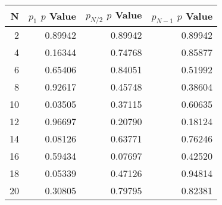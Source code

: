 \begin{tabular}{rrrr}
\toprule
  N &  $p_1$ $p$ Value &  $p_{N / 2}$ $p$ Value &  $p_{N - 1}$ $p$ Value \\
\midrule
  2 &          0.89942 &                0.89942 &                0.89942 \\
  4 &          0.16344 &                0.74768 &                0.85877 \\
  6 &          0.65406 &                0.84051 &                0.51992 \\
  8 &          0.92617 &                0.45748 &                0.38604 \\
 10 &          0.03505 &                0.37115 &                0.60635 \\
 12 &          0.96697 &                0.20790 &                0.18124 \\
 14 &          0.08126 &                0.63771 &                0.76246 \\
 16 &          0.59434 &                0.07697 &                0.42520 \\
 18 &          0.05339 &                0.47126 &                0.94814 \\
 20 &          0.30805 &                0.79795 &                0.82381 \\
\bottomrule
\end{tabular}
